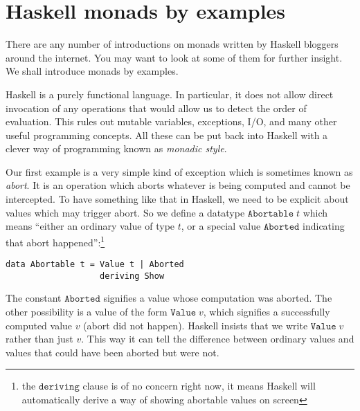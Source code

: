\documentclass[a4paper,10pt]{article}
\begin{document}




\appendix
    
\section{Haskell monads by examples} %
\label{app:monads}

There are any number of introductions on monads written by Haskell bloggers
around the internet. You may want to look at some of them for further insight.
We shall introduce monads by examples.

Haskell is a purely functional language. In particular, it does not allow
direct invocation of any operations that would allow us to detect the order of
evaluation. This rules out mutable variables, exceptions, I/O, and many other
useful programming concepts. All these can be put back into Haskell with a
clever way of programming known as \emph{monadic style}.

Our first example is a very simple kind of exception which is sometimes known
as \emph{abort}. It is an operation which aborts whatever is being computed
and cannot be intercepted. To have something like that in Haskell, we need to
be explicit about values which may trigger abort. So we define a datatype
$\mathtt{Abortable}\;t$ which means ``either an ordinary value of type $t$, or
a special value $\mathtt{Aborted}$ indicating that abort
happened'':\footnote{the $\mathtt{deriving}$ clause is of no concern right
  now, it means Haskell will automatically derive a way of showing abortable
  values on screen}

\begin{lstlisting}
data Abortable t = Value t | Aborted
                   deriving Show  
\end{lstlisting}
% 
The constant $\mathtt{Aborted}$ signifies a value whose computation was
aborted. The other possibility is a value of the form $\mathtt{Value}\;v$,
which signifies a successfully computed value $v$ (abort did not happen).
Haskell insists that we write $\mathtt{Value}\;v$ rather than just $v$. This
way it can tell the difference between ordinary values and values that could
have been aborted but were not.
\end{document}

